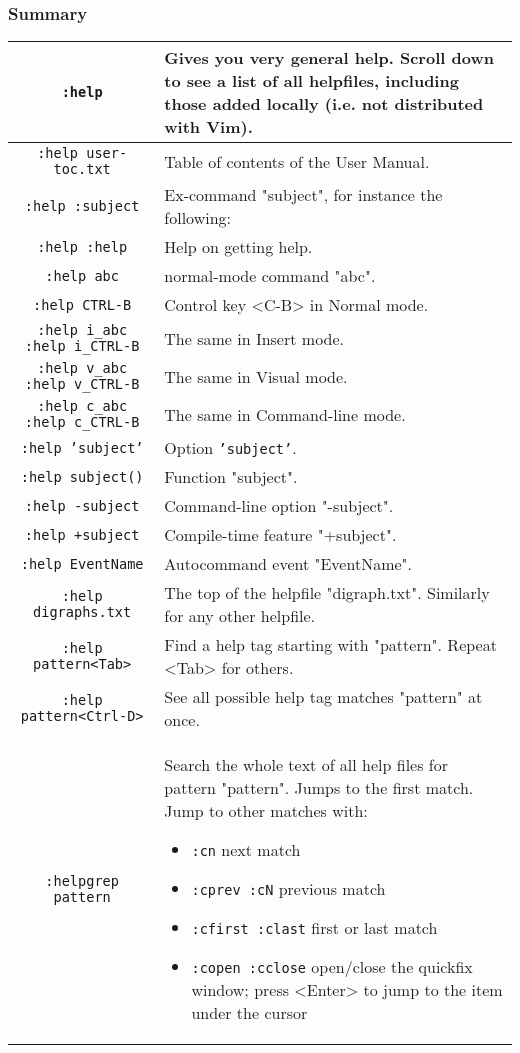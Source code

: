 \subsubsection{Summary}
\label{help-summary}
\begin{tabularx}{\textwidth}{|c | X|}
				\hline
				\texttt{:help} & 
				Gives you very general help.
				Scroll down to see a list of all helpfiles, including those added locally (i.e. not distributed with Vim). \\ \hline
				\texttt{:help user-toc.txt} & Table of contents of the User Manual.\\ \hline
				\texttt{:help :subject} & Ex-command "subject", for instance the following:\\ \hline
				\texttt{:help :help} & Help on getting help.\\ \hline
				\texttt{:help abc} & normal-mode command "abc".\\ \hline
				\texttt{:help CTRL-B} & Control key <C-B> in Normal mode.\\ \hline
				\texttt{:help i\_abc}  \texttt{:help i\_CTRL-B} & The same in Insert mode. \\ \hline
				\texttt{:help v\_abc}  \texttt{:help v\_CTRL-B} & The same in Visual mode. \\ \hline
				\texttt{:help c\_abc}  \texttt{:help c\_CTRL-B} & The same in Command-line mode. \\ \hline
				\texttt{:help 'subject'} & Option \texttt{'subject'}.\\ \hline
				\texttt{:help subject()} & Function "subject".\\ \hline
				\texttt{:help -subject} & Command-line option "-subject".\\ \hline
				\texttt{:help +subject} & Compile-time feature "+subject".\\ \hline
				\texttt{:help EventName} & Autocommand event "EventName".\\ \hline
				\texttt{:help digraphs.txt} & The top of the helpfile "digraph.txt". Similarly for any other helpfile.\\ \hline
				\texttt{:help pattern<Tab>} & Find a help tag starting with "pattern". Repeat <Tab> for others.\\ \hline
				\texttt{:help pattern<Ctrl-D>} & See all possible help tag matches "pattern" at once.\\ \hline
				\texttt{:helpgrep pattern} & Search the whole text of all help files for pattern "pattern".  Jumps to the first match.
				Jump to other matches with:
				\begin{itemize}
								\item \texttt{:cn} next match
								\item \texttt{:cprev :cN} previous match
								\item \texttt{:cfirst :clast} first or last match
								\item \texttt{:copen :cclose} open/close the quickfix window; press <Enter> to jump to the item under the cursor 
				\end{itemize}
				\\ \hline
\end{tabularx}
\clearpage

